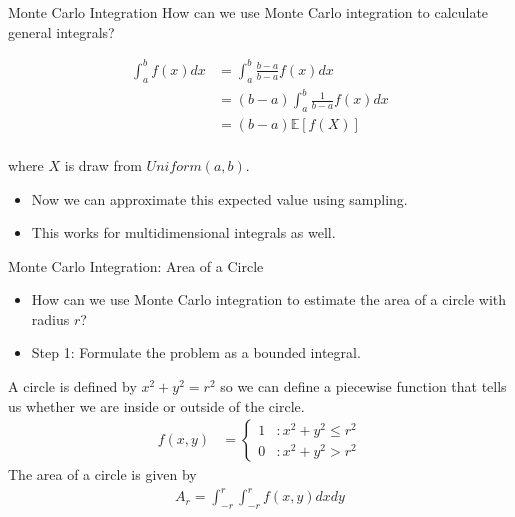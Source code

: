 \documentclass[serif,xcolor=pdftex,dvipsnames,table,hyperref={bookmarks=false,breaklinks}]{beamer}
\begin{document}
\begin{frame}[t]{Monte Carlo Integration}
	How can we use Monte Carlo integration to calculate general integrals?
	
	\pause
	\begin{align*}
		\int_a^b f(x) dx &= \int_a^b \frac{b-a}{b-a} f(x) dx\\
		&= (b-a) \int_a^b \frac{1}{b-a} f(x) dx\\
		&= (b-a) \mathbb{E}[f(X)]\\
	\end{align*}
	
	where $X$ is draw from $Uniform(a,b)$.
	
	\pause
	\begin{itemize}[<+->]
		\item Now we can approximate this expected value using sampling.
		\item This works for multidimensional integrals as well.
	\end{itemize}
\end{frame}

\begin{frame}[t]{Monte Carlo Integration: Area of a Circle}
	\begin{itemize}[<+->]
		\item How can we use Monte Carlo integration to estimate the area of a circle with radius $r$?
		\item Step 1: Formulate the problem as a bounded integral.
	\end{itemize}
	
	\pause
	A circle is defined by $x^2 + y^2 = r^2$ so we can define a piecewise function that tells us whether we are inside or outside of the circle.
	\begin{align*}
		f(x,y) &= \left\{
			\begin{array}{ll}
				1 & : x^2 + y^2 \leq r^2\\
				0 & : x^2 + y^2 > r^2
			\end{array}
		\right.
	\end{align*}
	\pause
	The area of a circle is given by
	\begin{align*}
		A_r = \int_{-r}^r \int_{-r}^r f(x,y) dx dy
	\end{align*}

\end{frame}
\end{document}
